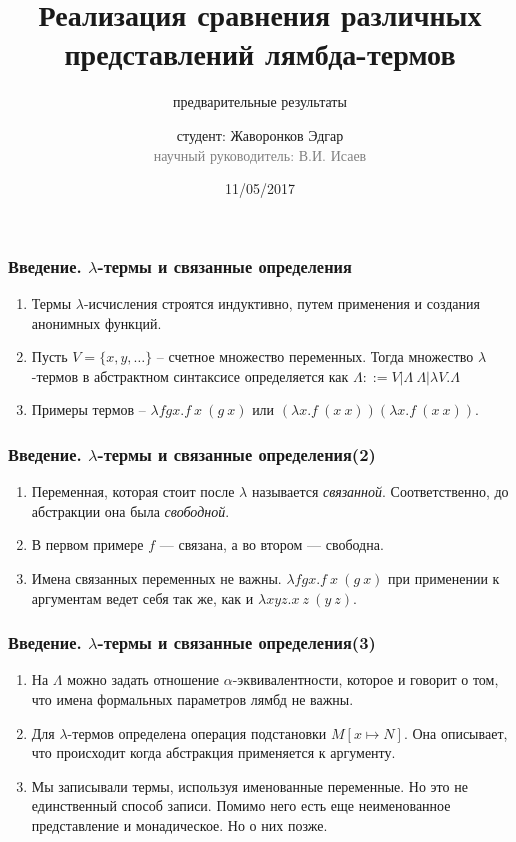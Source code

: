 \documentclass{beamer}
\begin{document}
\title[Формализация $\lambda$-исчисления]{Реализация сравнения различных представлений лямбда-термов}
\subtitle{предварительные результаты}
\author[Жаворонков Э.А.]{студент: Жаворонков Эдгар\\{\footnotesize\textcolor{gray}{научный руководитель: В.И. Исаев}}}
\date{11/05/2017}

\frame{\titlepage}

\begin{frame}\frametitle{Введение. $\lambda$-термы и связанные определения}
    \begin{enumerate}
        \item Термы $\lambda$-исчисления строятся индуктивно, путем применения и создания анонимных функций.
        \item Пусть $V = \{x, y, \dots\}$ -- счетное множество переменных. Тогда множество $\lambda$-термов в абстрактном синтаксисе определяется как $\Lambda ::= V | \Lambda\ \Lambda | \lambda V. \Lambda$
        \item Примеры термов -- $\lambda f g x. f\ x\ (g\ x)$ или $(\lambda x. f\ (x\ x))(\lambda x. f\ (x\ x))$.
    \end{enumerate}
\end{frame}


\begin{frame}\frametitle{Введение. $\lambda$-термы и связанные определения(2)}
    \begin{enumerate}
        \item Переменная, которая стоит после $\lambda$ называется \textit{связанной}. Соответственно, до абстракции она была \textit{свободной}.
        \item В первом примере $f$ --- связана, а во втором --- свободна.
        \item Имена связанных переменных не важны. $\lambda f g x.f\ x\ (g\ x)$ при применении к аргументам ведет себя так же, как  и $\lambda x y z. x\ z\ (y\ z)$.
    \end{enumerate}
\end{frame}


\begin{frame}\frametitle{Введение. $\lambda$-термы и связанные определения(3)}
    \begin{enumerate}
        \item На $\Lambda$ можно задать отношение $\alpha$-эквивалентности, которое и говорит о том, что имена формальных параметров лямбд не важны.
        \item Для $\lambda$-термов определена операция подстановки $M[x \mapsto N]$. Она описывает, что происходит когда абстракция применяется к аргументу.
        \item Мы записывали термы, используя именованные переменные. Но это не единственный способ записи. Помимо него есть еще неименованное представление и монадическое. Но о них позже.
    \end{enumerate}
\end{frame}
\end{document}
